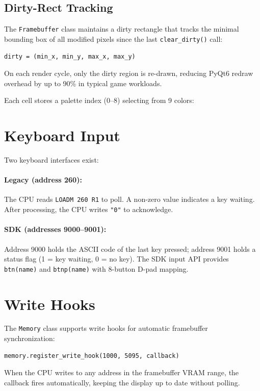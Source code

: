 \documentclass[10pt,a4paper,twoside]{book}
\begin{document}
\subsection{Dirty-Rect Tracking}

The \texttt{Framebuffer} class maintains a dirty rectangle that tracks the
minimal bounding box of all modified pixels since the last \texttt{clear\_dirty()}
call:
\begin{verbatim}
dirty = (min_x, min_y, max_x, max_y)
\end{verbatim}
On each render cycle, only the dirty region is re-drawn, reducing PyQt6 redraw
overhead by up to 90\% in typical game workloads.

Each cell stores a palette index (0--8) selecting from 9 colors:

\section{Keyboard Input}

Two keyboard interfaces exist:

\paragraph{Legacy (address 260):} The CPU reads \texttt{LOADM 260 R1} to poll. A
non-zero value indicates a key waiting. After processing, the CPU writes \texttt{"0"}
to acknowledge.

\paragraph{SDK (addresses 9000--9001):} Address 9000 holds the ASCII code of the last
key pressed; address 9001 holds a status flag (1 = key waiting, 0 = no key). The SDK
input API provides \texttt{btn(name)} and \texttt{btnp(name)} with 8-button D-pad
mapping.

\section{Write Hooks}

The \texttt{Memory} class supports write hooks for automatic framebuffer
synchronization:
\begin{verbatim}
memory.register_write_hook(1000, 5095, callback)
\end{verbatim}
When the CPU writes to any address in the framebuffer VRAM range, the callback fires
automatically, keeping the display up to date without polling.
\end{document}

